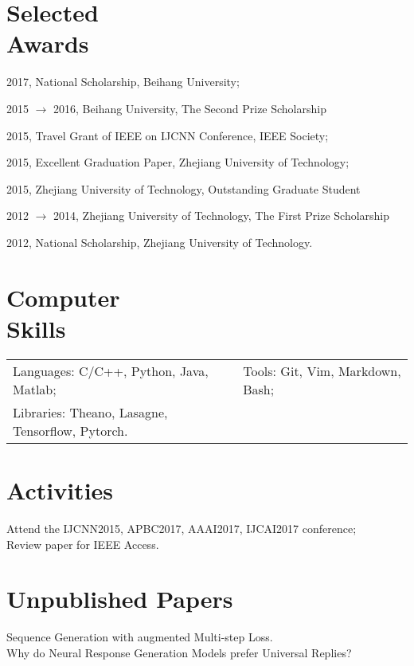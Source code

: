 \documentclass[margin,line]{resume}
\begin{document}
\begin{resume}
\section{Selected \\ Awards}


2017, National Scholarship, Beihang University;

2015 $\to$ 2016, Beihang University, The Second Prize Scholarship

2015, Travel Grant of IEEE on IJCNN Conference, IEEE Society;

2015, Excellent Graduation Paper, Zhejiang University of Technology;

2015, Zhejiang University of Technology, Outstanding Graduate Student

2012 $\to$ 2014, Zhejiang University of Technology, The First Prize Scholarship

2012, National Scholarship, Zhejiang University of Technology.




\section{Computer \\ Skills}
\begin{tabular}{@{}p{3.5in}p{4in}}
Languages: C/C++, Python, Java, Matlab;& Tools: Git, Vim, Markdown, Bash; \\
Libraries: Theano, Lasagne, Tensorflow, Pytorch.  &  \\
\end{tabular}

\section{Activities}
Attend the IJCNN2015, APBC2017, AAAI2017, IJCAI2017 conference;\\
Review paper for IEEE Access.

\section{Unpublished Papers}
Sequence Generation with augmented Multi-step Loss. \\
Why do Neural Response Generation Models prefer Universal Replies? \\

\end{resume}
\end{document}
